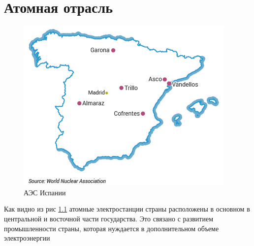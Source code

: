  \chapter{Атомная отрасль}

\begin{figure}[h]
	\begin{center}
		\includegraphics[width=.5\columnwidth]{./img/world_n_a.png}
	\end{center}
	\caption{АЭС Испании}
	\label{pic:mapOfNPP}
\end{figure}

Как видно из рис \ref{pic:mapOfNPP} атомные электростанции страны расположены в основном в центральной и восточной части государства. Это связано с развитием промышленности страны, которая нуждается в дополнительном объеме электроэнергии